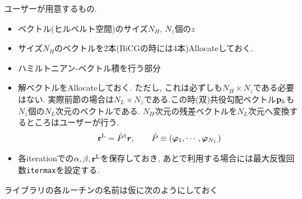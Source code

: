 \documentclass[12pt,titlepage]{jarticle}
\begin{document}
ユーザーが用意するもの.
\begin{itemize}
\item ベクトル(ヒルベルト空間)のサイズ$N_H$, $N_z$個の$z$
\item サイズ$N_H$のベクトルを2本(BiCGの時には4本)Allocateしておく.
\item ハミルトニアン-ベクトル積を行う部分
\item 解ベクトルをAllocateしておく. ただし, これは必ずしも$N_H \times N_z$である必要はない.
  実際前節の場合は$N_L \times N_z$である.この時(双)共役勾配ベクトル${{\bf p}_k}$も
  $N_z$個の$N_L$次元のベクトルである.
  $N_H$次元の残差ベクトルを$N_L$次元へ変換するところはユーザーが行う.
  \begin{align}
    {\bf r}^{\rm L} = {\hat P}^\dagger {\boldsymbol r}, \qquad
    {\hat P} \equiv ({\boldsymbol \varphi}_1, \cdots, {\boldsymbol \varphi}_{N_L})
  \end{align}
\item 各iterationでの$\alpha, \beta, {\bf r}^{\rm L}$を保存しておき, 
あとで利用する場合には最大反復回数\verb|itermax|を設定する.
\end{itemize}
ライブラリの各ルーチンの名前は仮に次のようにしておく
\end{document}
